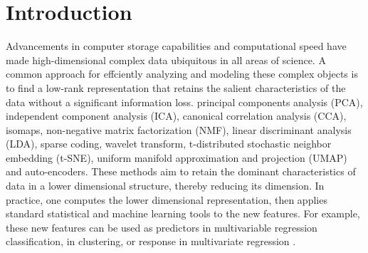 \section{Introduction}

Advancements in computer storage capabilities and computational speed have made high-dimensional complex data ubiquitous in all areas of science. A common approach for effciently analyzing and modeling these complex objects is to find a low-rank representation that retains the salient characteristics of the data without a significant information loss.
 principal components analysis (PCA), independent component analysis (ICA), canonical correlation analysis (CCA), isomaps, non-negative matrix factorization (NMF), linear discriminant analysis (LDA), sparse coding, wavelet transform, t-distributed stochastic neighbor embedding (t-SNE), uniform manifold approximation and projection (UMAP) and auto-encoders. 
These methods aim to retain the dominant characteristics of data in a lower dimensional structure, thereby reducing its dimension. 
In practice, one computes the lower dimensional representation, then applies standard statistical and machine learning tools to the new features. 
For example, these new features can be used as predictors in multivariable regression  classification, in clustering, or  response  in multivariate regression .

